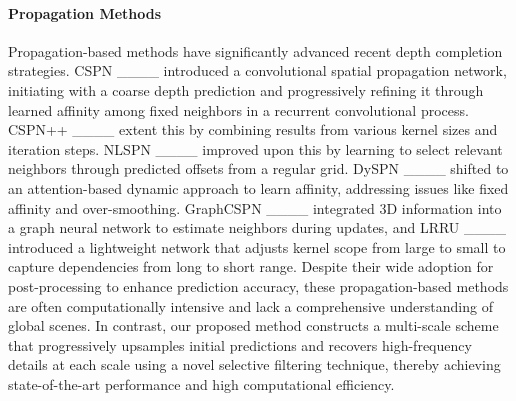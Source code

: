 \paragraph{Propagation Methods}
Propagation-based methods have significantly advanced recent depth completion strategies. CSPN ____ introduced a convolutional spatial propagation network, initiating with a coarse depth prediction and progressively refining it through learned affinity among fixed neighbors in a recurrent convolutional process. CSPN++ ____ extent this by combining results from various kernel sizes and iteration steps. NLSPN ____ improved upon this by learning to select relevant neighbors through predicted offsets from a regular grid. DySPN ____ shifted to an attention-based dynamic approach to learn affinity, addressing issues like fixed affinity and over-smoothing. GraphCSPN ____ integrated 3D information into a graph neural network to estimate neighbors during updates, and LRRU ____ introduced a lightweight network that adjusts kernel scope from large to small to capture dependencies from long to short range. Despite their wide adoption for post-processing to enhance prediction accuracy, these propagation-based methods are often computationally intensive and lack a comprehensive understanding of global scenes. In contrast, our proposed method constructs a multi-scale scheme that progressively upsamples initial predictions and recovers high-frequency details at each scale using a novel selective filtering technique, thereby achieving state-of-the-art performance and high computational efficiency.